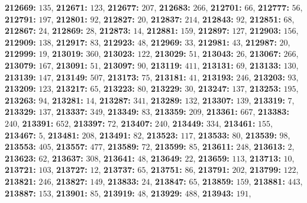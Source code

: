 \textsf{\bfseries 212669:} $135$, \textsf{\bfseries 212671:} $123$, \textsf{\bfseries 212677:} $207$, \textsf{\bfseries 212683:} $266$, \textsf{\bfseries 212701:} $66$, \textsf{\bfseries 212777:} $56$, \textsf{\bfseries 212791:} $197$, \textsf{\bfseries 212801:} $92$, \textsf{\bfseries 212827:} $20$, \textsf{\bfseries 212837:} $214$, \textsf{\bfseries 212843:} $92$, \textsf{\bfseries 212851:} $68$, \textsf{\bfseries 212867:} $24$, \textsf{\bfseries 212869:} $28$, \textsf{\bfseries 212873:} $14$, \textsf{\bfseries 212881:} $159$, \textsf{\bfseries 212897:} $127$, \textsf{\bfseries 212903:} $156$, \textsf{\bfseries 212909:} $138$, \textsf{\bfseries 212917:} $83$, \textsf{\bfseries 212923:} $48$, \textsf{\bfseries 212969:} $33$, \textsf{\bfseries 212981:} $43$, \textsf{\bfseries 212987:} $20$, \textsf{\bfseries 212999:} $19$, \textsf{\bfseries 213019:} $360$, \textsf{\bfseries 213023:} $122$, \textsf{\bfseries 213029:} $51$, \textsf{\bfseries 213043:} $26$, \textsf{\bfseries 213067:} $266$, \textsf{\bfseries 213079:} $167$, \textsf{\bfseries 213091:} $51$, \textsf{\bfseries 213097:} $90$, \textsf{\bfseries 213119:} $411$, \textsf{\bfseries 213131:} $69$, \textsf{\bfseries 213133:} $130$, \textsf{\bfseries 213139:} $147$, \textsf{\bfseries 213149:} $507$, \textsf{\bfseries 213173:} $75$, \textsf{\bfseries 213181:} $41$, \textsf{\bfseries 213193:} $246$, \textsf{\bfseries 213203:} $93$, \textsf{\bfseries 213209:} $123$, \textsf{\bfseries 213217:} $65$, \textsf{\bfseries 213223:} $80$, \textsf{\bfseries 213229:} $30$, \textsf{\bfseries 213247:} $137$, \textsf{\bfseries 213253:} $195$, \textsf{\bfseries 213263:} $94$, \textsf{\bfseries 213281:} $14$, \textsf{\bfseries 213287:} $341$, \textsf{\bfseries 213289:} $132$, \textsf{\bfseries 213307:} $139$, \textsf{\bfseries 213319:} $7$, \textsf{\bfseries 213329:} $137$, \textsf{\bfseries 213337:} $349$, \textsf{\bfseries 213349:} $83$, \textsf{\bfseries 213359:} $209$, \textsf{\bfseries 213361:} $667$, \textsf{\bfseries 213383:} $240$, \textsf{\bfseries 213391:} $652$, \textsf{\bfseries 213397:} $72$, \textsf{\bfseries 213407:} $240$, \textsf{\bfseries 213449:} $334$, \textsf{\bfseries 213461:} $155$, \textsf{\bfseries 213467:} $5$, \textsf{\bfseries 213481:} $208$, \textsf{\bfseries 213491:} $82$, \textsf{\bfseries 213523:} $117$, \textsf{\bfseries 213533:} $80$, \textsf{\bfseries 213539:} $98$, \textsf{\bfseries 213553:} $405$, \textsf{\bfseries 213557:} $477$, \textsf{\bfseries 213589:} $72$, \textsf{\bfseries 213599:} $85$, \textsf{\bfseries 213611:} $248$, \textsf{\bfseries 213613:} $2$, \textsf{\bfseries 213623:} $62$, \textsf{\bfseries 213637:} $308$, \textsf{\bfseries 213641:} $48$, \textsf{\bfseries 213649:} $22$, \textsf{\bfseries 213659:} $113$, \textsf{\bfseries 213713:} $10$, \textsf{\bfseries 213721:} $103$, \textsf{\bfseries 213727:} $12$, \textsf{\bfseries 213737:} $65$, \textsf{\bfseries 213751:} $86$, \textsf{\bfseries 213791:} $202$, \textsf{\bfseries 213799:} $122$, \textsf{\bfseries 213821:} $246$, \textsf{\bfseries 213827:} $149$, \textsf{\bfseries 213833:} $24$, \textsf{\bfseries 213847:} $65$, \textsf{\bfseries 213859:} $159$, \textsf{\bfseries 213881:} $443$, \textsf{\bfseries 213887:} $153$, \textsf{\bfseries 213901:} $85$, \textsf{\bfseries 213919:} $48$, \textsf{\bfseries 213929:} $488$, \textsf{\bfseries 213943:} $191$, 
